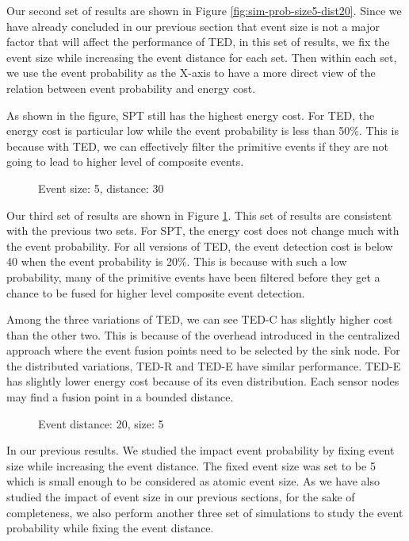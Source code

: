 Our second set of results are shown in Figure \ref{fig:sim-prob-size5-dist20}. Since we have already concluded in our previous section that event size is not a major factor that will affect the performance of TED, in this set of results, we fix the event size while increasing the event distance for each set. Then within each set, we use the event probability as the X-axis to have a more direct view of the relation between event probability and energy cost.

As shown in the figure, SPT still has the highest energy cost. For TED, the energy cost is particular low while the event probability is less than 50\%. This is because with TED, we can effectively filter the primitive events if they are not going to lead to higher level of composite events.

\begin{figure}
\centering
{}
\caption{Event size: 5, distance: 30}
\label{fig:sim-prob-size5-dist30}
\end{figure}

Our third set of results are shown in Figure \ref{fig:sim-prob-size5-dist30}. This set of results are consistent with the previous two sets. For SPT, the energy cost does not change much with the event probability. For all versions of TED, the event detection cost is below 40 when the event probability is 20\%. This is because with such a low probability, many of the primitive events have been filtered before they get a chance to be fused for higher level composite event detection.

Among the three variations of TED, we can see TED-C has slightly higher cost than the other two. This is because of the overhead introduced in the centralized approach where the event fusion points need to be selected by the sink node. For the distributed variations, TED-R and TED-E have similar performance. TED-E has slightly lower energy cost because of its even distribution. Each sensor nodes may find a fusion point in a bounded distance.

\begin{figure}
\centering
{}
\caption{Event distance: 20, size: 5}
\label{fig:sim-prob-dist20-size5}
\end{figure}

In our previous results. We studied the impact event probability by fixing event size while increasing the event distance. The fixed event size was set to be 5 which is small enough to be considered as atomic event size. As we have also studied the impact of event size in our previous sections, for the sake of completeness, we also perform another three set of simulations to study the event probability while fixing the event distance.


